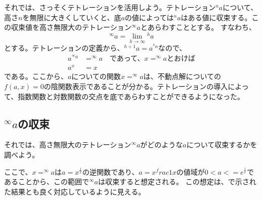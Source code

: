 	それでは、さっそくテトレーションを活用しよう。テトレーション$^n a$について、高さ$n$を無限に大きくしていくと、底$a$の値によっては$^n a$はある値に収束する。この収束値を高さ無限大のテトレーション$^\infty a$とあらわすこととする。
	すなわち、
	\begin{equation*}
		^\infty a = \lim_{h \to \infty} {^h a}
	\end{equation*}
	とする。テトレーションの定義から、$^{h+1} a = a^{^h a}$なので、
	\begin{align*}
		a ^{^\infty a} &= ^\infty a \quad \text{であって、$x = ^\infty a$とおけば} \\
		a^x &= x
	\end{align*}
	である。ここから、$a$についての関数$x = ^\infty a$は、不動点解についての$f(a,x) = 0$の陰関数表示であることが分かる。テトレーションの導入によって、指数関数と対数関数の交点を底であらわすことができるようになった。
	
\subsection{$^\infty a$の収束}
	それでは、高さ無限大のテトレーション$^\infty a$がどのような$a$について収束するかを調べよう。
	
	ここで、$x = ^\infty a$は$a = x^\frac{1}{x}$の逆関数であり、$a = x^frac{1}{x}$の値域が$0 < a <= e^\frac{1}{e}$であることから、この範囲で$^\infty a$は収束すると想定される。
	この想定は、で示された結果とも良く対応しているように見える。
	
